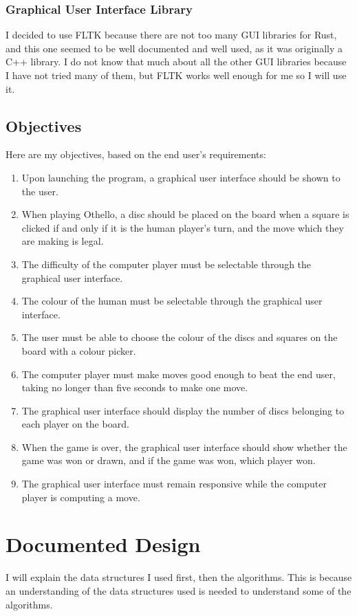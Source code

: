 \documentclass[12pt, a4paper]{report}
\begin{document}
\subsection{Graphical User Interface Library}
I decided to use FLTK because there are not too many GUI libraries for Rust, and this one seemed to be well documented and well used, as it was originally a C++ library.
I do not know that much about all the other GUI libraries because I have not tried many of them, but FLTK works well enough for me so I will use it.

\section{Objectives}
Here are my objectives, based on the end user's requirements:
\begin{enumerate}
	\item Upon launching the program, a graphical user interface should be shown to the user.
	\item When playing Othello, a disc should be placed on the board when a square is clicked if and only if it is the human player's turn, and the move which they are making is legal.
	\item The difficulty of the computer player must be selectable through the graphical user interface.
	\item The colour of the human must be selectable through the graphical user interface.
	\item The user must be able to choose the colour of the discs and squares on the board with a colour picker.
	\item The computer player must make moves good enough to beat the end user, taking no longer than five seconds to make one move.
	\item The graphical user interface should display the number of discs belonging to each player on the board.
	\item When the game is over, the graphical user interface should show whether the game was won or drawn, and if the game was won, which player won.
	\item The graphical user interface must remain responsive while the computer player is computing a move.
\end{enumerate}

\chapter{Documented Design}
I will explain the data structures I used first, then the algorithms. This is because an understanding of the data structures used is needed to understand some of the algorithms.
\end{document}
